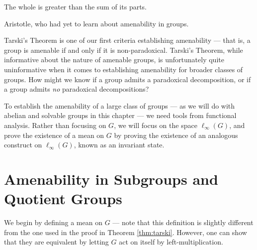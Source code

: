 \epigraph{The whole is greater than the sum of its parts.}{Aristotle, who had yet to learn about amenability in groups.}
Tarski's Theorem is one of our first criteria establishing amenability --- that is, a group is amenable if and only if it is non-paradoxical. Tarski's Theorem, while informative about the nature of amenable groups, is unfortunately quite uninformative when it comes to establishing amenability for broader classes of groups. How might we know if a group admits a paradoxical decomposition, or if a group admits \textit{no} paradoxical decompositions?\newline

To establish the amenability of a large class of groups --- as we will do with abelian and solvable groups in this chapter --- we need tools from functional analysis. Rather than focusing on $G$, we will focus on the space $\ell_{\infty}(G)$, and prove the existence of a mean on $G$ by proving the existence of an analogous construct on $\ell_{\infty}(G)$, known as an invariant state.
\section{Amenability in Subgroups and Quotient Groups}\label{sec:amenability_subgroups_quotients}%
We begin by defining a mean on $G$ --- note that this definition is slightly different from the one used in the proof in Theorem \ref{thm:tarski}. However, one can show that they are equivalent by letting $G$ act on itself by left-multiplication.\newline

